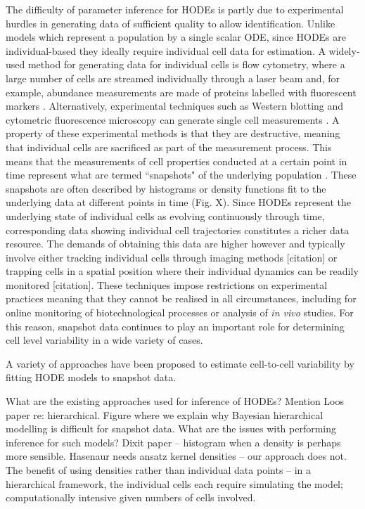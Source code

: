 \documentclass[10pt,letterpaper]{article}
\begin{document}
The difficulty of parameter inference for HODEs is partly due to experimental hurdles in generating data of sufficient quality to allow identification. Unlike models which represent a population by a single scalar ODE, since HODEs are individual-based they ideally require individual cell data for estimation. A widely-used method for generating data for individual cells is flow cytometry, where a large number of cells are streamed individually through a laser beam and, for example, abundance measurements are made of proteins labelled with fluorescent markers \cite{telford2012flow}. Alternatively, experimental techniques such as Western blotting and cytometric fluorescence microscopy can generate single cell measurements \cite{hughes2014single,hasenauer2011identification}. A property of these experimental methods is that they are destructive, meaning that individual cells are sacrificed as part of the measurement process. This means that the measurements of cell properties conducted at a certain point in time represent what are termed ``snapshots" of the underlying population \cite{hasenauer2011identification}. These snapshots are often described by histograms \cite{dixit2018maximum} or density functions \cite{waldherr2018estimation} fit to the underlying data at different points in time (Fig. X). Since HODEs represent the underlying state of individual cells as evolving continuously through time, corresponding data showing individual cell trajectories constitutes a richer data resource. The demands of obtaining this data are higher however and typically involve either tracking individual cells through imaging methods [citation] or trapping cells in a spatial position where their individual dynamics can be readily monitored [citation]. These techniques impose restrictions on experimental practices meaning that they cannot be realised in all circumstances, including for online monitoring of biotechnological processes or analysis of \textit{in vivo} studies. For this reason, snapshot data continues to play an important role for determining cell level variability in a wide variety of cases.


A variety of approaches have been proposed to estimate cell-to-cell variability by fitting HODE models to snapshot data.



What are the existing approaches used for inference of HODEs? Mention Loos paper re: hierarchical. Figure where we explain why Bayesian hierarchical modelling is difficult for snapshot data. What are the issues with performing inference for such models? Dixit paper -- histogram when a density is perhaps more sensible. Hasenaur needs ansatz kernel densities -- our approach does not. The benefit of using densities rather than individual data points -- in a hierarchical framework, the individual cells each require simulating the model; computationally intensive given numbers of cells involved.
\end{document}
